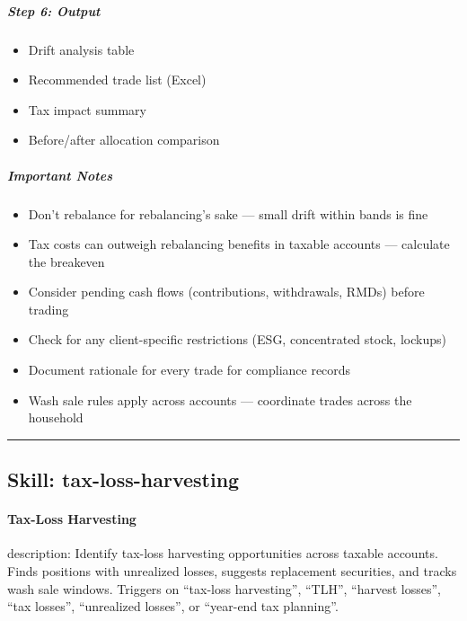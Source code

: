 \documentclass[11pt]{article}
\begin{document}
\subparagraph{Step 6: Output}\mbox{}\par

\begin{itemize}[leftmargin=*,itemsep=2pt,topsep=2pt]
\item {} Drift analysis table
\item {} Recommended trade list (Excel)
\item {} Tax impact summary
\item {} Before/after allocation comparison
\end{itemize}

\subparagraph{Important Notes}\mbox{}\par

\begin{itemize}[leftmargin=*,itemsep=2pt,topsep=2pt]
\item {} Don't rebalance for rebalancing's sake — small drift within bands is fine
\item {} Tax costs can outweigh rebalancing benefits in taxable accounts — calculate the breakeven
\item {} Consider pending cash flows (contributions, withdrawals, RMDs) before trading
\item {} Check for any client-specific restrictions (ESG, concentrated stock, lockups)
\item {} Document rationale for every trade for compliance records
\item {} Wash sale rules apply across accounts — coordinate trades across the household
\end{itemize}

\vspace{0.8em}\hrule\vspace{0.8em}

\subsection{Skill: tax-loss-harvesting}\label{file:skills-tax-loss-harvesting-SKILL.md}

\paragraph{Tax-Loss Harvesting}\mbox{}\par

description: Identify tax-loss harvesting opportunities across taxable accounts. Finds positions with unrealized losses, suggests replacement securities, and tracks wash sale windows. Triggers on ``tax-loss harvesting'', ``TLH'', ``harvest losses'', ``tax losses'', ``unrealized losses'', or ``year-end tax planning''.
\end{document}
